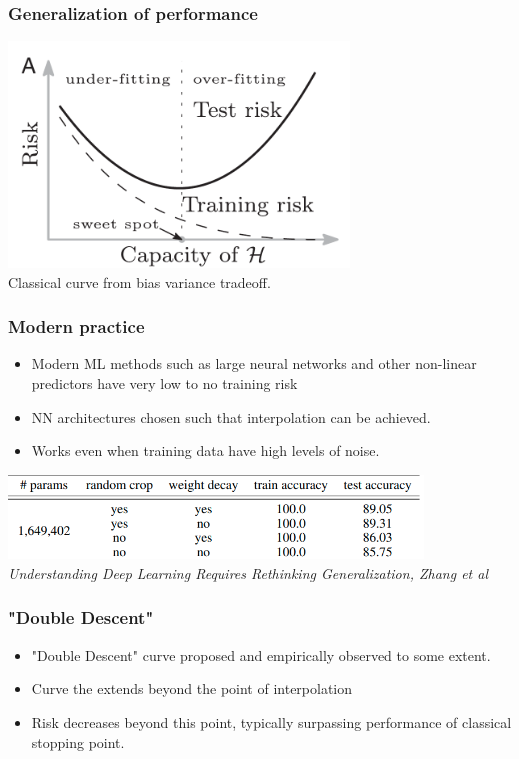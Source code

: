 \documentclass{beamer}
\begin{document}
\begin{frame}
\frametitle{Generalization of performance}
\includegraphics[height=6cm]{UCurve.png}
\\Classical curve from bias variance tradeoff.
\end{frame}

\begin{frame}
\frametitle{Modern practice}
\begin{itemize}[itemsep = 12pt]
	\item Modern ML methods such as large neural networks and other non-linear predictors have very low to no training risk
	\item NN architectures chosen such that interpolation can be achieved.
	\item Works even when training data have high levels of noise.
\end{itemize}
\end{frame}

\begin{frame}
\includegraphics[width=11cm]{Good_Interpolation_Zhang.png}
\\ \textit{Understanding Deep Learning Requires Rethinking Generalization, Zhang et al} 
\end{frame}

\begin{frame}
\frametitle{"Double Descent"}
\begin{itemize}[itemsep = 12pt]
	\item "Double Descent" curve proposed and empirically observed to some extent.
	\item Curve the extends beyond the point of interpolation
	\item Risk decreases beyond this point, typically surpassing performance of classical stopping point.
\end{itemize}
\end{frame}
\end{document}

